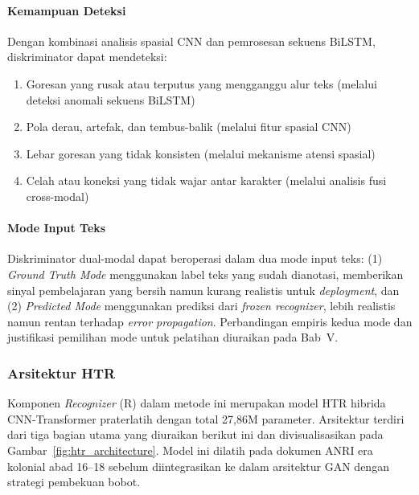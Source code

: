 \paragraph{Kemampuan Deteksi}

Dengan kombinasi analisis spasial CNN dan pemrosesan sekuens BiLSTM, diskriminator dapat mendeteksi:
\begin{enumerate}[label=\alph*., leftmargin=1.5em, labelsep=0.5em, itemindent=0pt, noitemsep, topsep=0pt]
  \item Goresan yang rusak atau terputus yang mengganggu alur teks (melalui deteksi anomali sekuens BiLSTM)
  \item Pola derau, artefak, dan tembus-balik (melalui fitur spasial CNN)
  \item Lebar goresan yang tidak konsisten (melalui mekanisme atensi spasial)
  \item Celah atau koneksi yang tidak wajar antar karakter (melalui analisis fusi cross-modal)
\end{enumerate}

\paragraph{Mode Input Teks}

Diskriminator dual-modal dapat beroperasi dalam dua mode input teks: (1) \textit{Ground Truth Mode} menggunakan label teks yang sudah dianotasi, memberikan sinyal pembelajaran yang bersih namun kurang realistis untuk \textit{deployment}, dan (2) \textit{Predicted Mode} menggunakan prediksi dari \textit{frozen recognizer}, lebih realistis namun rentan terhadap \textit{error propagation}. Perbandingan empiris kedua mode dan justifikasi pemilihan mode untuk pelatihan diuraikan pada Bab~V.


\subsubsection{Arsitektur HTR}
\label{subsubsec:frozen-recognizer}

Komponen \textit{Recognizer} (R) dalam metode ini merupakan model HTR hibrida CNN-Transformer praterlatih dengan total 27,86M parameter. Arsitektur terdiri dari tiga bagian utama yang diuraikan berikut ini dan divisualisasikan pada Gambar~\ref{fig:htr_architecture}. Model ini dilatih pada dokumen ANRI era kolonial abad 16--18 sebelum diintegrasikan ke dalam arsitektur GAN dengan strategi pembekuan bobot.


